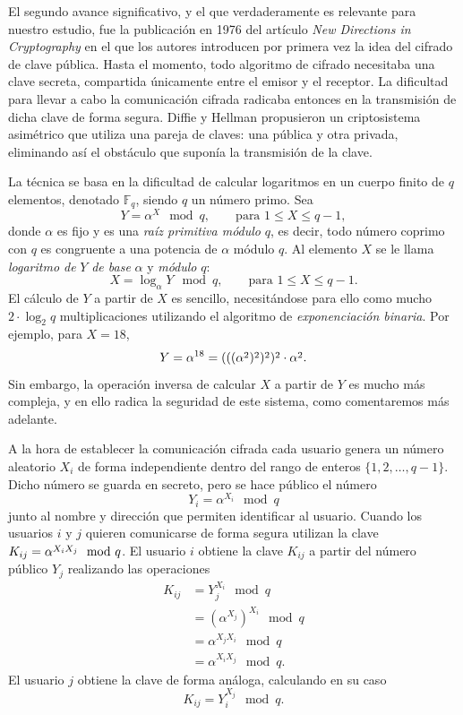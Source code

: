 \documentclass[
  a4paper,
  12pt,
  spanish,
]{scrartcl}
\begin{document}
El segundo avance significativo, y el que verdaderamente es relevante para nuestro estudio, fue la publicación en 1976 del artículo \textit{New Directions in Cryptography} \parencite{diffie_new_1976} en el que los autores introducen por primera vez la idea del cifrado de clave pública. 
Hasta el momento, todo algoritmo de cifrado necesitaba una clave secreta, compartida únicamente entre el emisor y el receptor. 
La dificultad para llevar a cabo la comunicación cifrada radicaba entonces en la transmisión de dicha clave de forma segura. 
Diffie y Hellman propusieron un criptosistema asimétrico que utiliza una pareja de claves: una pública y otra privada, eliminando así el obstáculo que suponía la transmisión de la clave.

La técnica se basa en la dificultad de calcular logaritmos en un cuerpo finito de \(q\) elementos, denotado \(\mathbb F_q\), siendo \(q\) un número primo. 
Sea \[Y = \alpha^X \mod q, \qquad \text{para } 1 \leq X \leq q - 1,\] donde \(\alpha\) es fijo y es una \textit{raíz primitiva módulo} \(q\), es decir, todo número coprimo con \(q\) es congruente a una potencia de \(\alpha\) módulo \(q\). 
Al elemento \(X\) se le llama \textit{logaritmo de} \(Y\) \textit{de base} \(\alpha\) y \textit{módulo} \(q\): \[X = \log_{\alpha} Y \mod q, \qquad \text{para } 1 \leq X \leq q - 1.\]
El cálculo de \(Y\) a partir de \(X\) es sencillo, necesitándose para ello como mucho \(2 \cdot \log_2 q\) multiplicaciones utilizando el algoritmo de \textit{exponenciación binaria}. Por ejemplo, para \(X = 18\), \[Y = \alpha^{18} = \cramped{(((\alpha^2)^2)^2)^2} \cdot \cramped{\alpha^2}.\]
Sin embargo, la operación inversa de calcular \(X\) a partir de \(Y\) es mucho más compleja, y en ello radica la seguridad de este sistema, como comentaremos más adelante.

A la hora de establecer la comunicación cifrada cada usuario genera un número aleatorio \(X_i\) de forma independiente dentro del rango de enteros \(\{1, 2, \dots, q - 1\}\). 
Dicho número se guarda en secreto, pero se hace público el número \[Y_i = \alpha^{X_i} \mod q\] junto al nombre y dirección que permiten identificar al usuario. 
Cuando los usuarios \(i\) y \(j\) quieren comunicarse de forma segura utilizan la clave \(K_{ij} = \cramped{\alpha^{X_iX_j}} \mod q\). 
El usuario \(i\) obtiene la clave \(K_{ij}\) a partir del número público \(Y_j\) realizando las operaciones \begin{align*}
  K_{ij} &= Y_j^{X_i} \mod q \\
    &= (\alpha^{X_j})^{X_i} \mod q \\
    &= \alpha^{X_jX_i} \mod q \\
    &= \alpha^{X_iX_j} \mod q.
\end{align*}
El usuario \(j\) obtiene la clave de forma análoga, calculando en su caso \[K_{ij} = Y_i^{X_j} \mod q.\]
\end{document}

